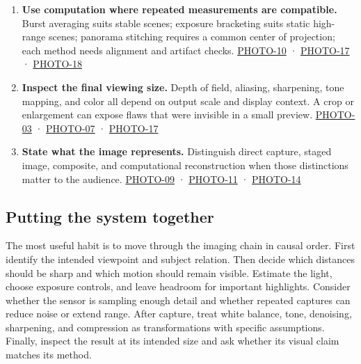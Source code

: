 \begin{enumerate}
\item
  \textbf{Use computation where repeated measurements are compatible.} Burst averaging suits stable scenes; exposure bracketing suits static high-range scenes; panorama stitching requires a common center of projection; each method needs alignment and artifact checks. \hyperref[04-visual-computing-ii-ch036-photo-10---photography-session-10]{PHOTO-10} · \hyperref[04-visual-computing-ii-ch036-photo-17---photography-session-17]{PHOTO-17} · \hyperref[04-visual-computing-ii-ch036-photo-18---photography-session-18]{PHOTO-18}
\item
  \textbf{Inspect the final viewing size.} Depth of field, aliasing, sharpening, tone mapping, and color all depend on output scale and display context. A crop or enlargement can expose flaws that were invisible in a small preview. \hyperref[04-visual-computing-ii-ch036-photo-03---photography-session-03]{PHOTO-03} · \hyperref[04-visual-computing-ii-ch036-photo-07---photography-session-07]{PHOTO-07} · \hyperref[04-visual-computing-ii-ch036-photo-17---photography-session-17]{PHOTO-17}
\item
  \textbf{State what the image represents.} Distinguish direct capture, staged image, composite, and computational reconstruction when those distinctions matter to the audience. \hyperref[04-visual-computing-ii-ch036-photo-09---photography-session-09]{PHOTO-09} · \hyperref[04-visual-computing-ii-ch036-photo-11---photography-session-11]{PHOTO-11} · \hyperref[04-visual-computing-ii-ch036-photo-14---photography-session-14]{PHOTO-14}
\end{enumerate}


\subsection{Putting the system together}\label{04-visual-computing-ii-ch034-putting-the-system-together}

\hypertarget{04-visual-computing-ii-ch034-putting-the-system-together}{}

The most useful habit is to move through the imaging chain in causal order. First identify the intended viewpoint and subject relation. Then decide which distances should be sharp and which motion should remain visible. Estimate the light, choose exposure controls, and leave headroom for important highlights. Consider whether the sensor is sampling enough detail and whether repeated captures can reduce noise or extend range. After capture, treat white balance, tone, denoising, sharpening, and compression as transformations with specific assumptions. Finally, inspect the result at its intended size and ask whether its visual claim matches its method.

